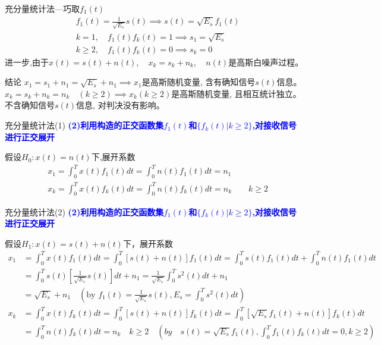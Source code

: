 \begin{frame}[shrink]{充分量统计法---巧取$f_1(t)$}
\begin{align*}
&f_1(t)=\frac{1}{\sqrt{E_s}}s(t)\implies s(t)=\sqrt{E_s}f_1(t)\\
&k=1,\quad f_1(t)f_k(t)=1\implies s_1=\sqrt{E_s}\\
&k\ge 2,\quad f_1(t)f_k(t)=0\implies s_k=0
\end{align*}
进一步,由于$x(t)=s(t)+n(t),\quad x_k=s_k+n_k,\quad n(t)$是高斯白噪声过程。
\begin{block}{结论}
	$x_1=s_1+n_1=\sqrt{E_s}+n_1\implies x_1$是高斯随机变量, 含有确知信号$s(t)$信息。\\
	$x_k=s_k+n_k=n_k\quad(k\ge 2)\implies x_k(k\ge 2)$是高斯随机变量,  且相互统计独立。不含确知信号$s(t)$信息, 对判决没有影响。\\
\end{block}
\end{frame}

\begin{frame}[shrink]{充分量统计法(1)}
\textbf{\textcolor{blue}{(2)利用构造的正交函数集$f_1(t)$和$\{f_k(t)|k\ge 2\}$,对接收信号进行正交展开}}
\begin{block}{假设$H_0:x(t)=n(t)$下,展开系数}
\begin{align*}	
&x_1=\int_{0}^{T}x(t)f_1(t)dt=\int_{0}^{T}n(t)f_1(t)dt=n_1\\
&x_k=\int_{0}^{T}x(t)f_k(t)dt=\int_{0}^{T}n(t)f_k(t)dt=n_k\qquad k\ge 2
\end{align*}
\end{block}
\end{frame}

\begin{frame}[shrink]{充分量统计法(2)}
\textbf{\textcolor{blue}{(2)利用构造的正交函数集$f_1(t)$和$\{f_k(t)|k\ge 2\}$,对接收信号进行正交展开}}
\begin{block}{假设$H_1:x(t)=s(t)+n(t)$下，展开系数}
\begin{align*}
	x_1&=\int_{0}^{T}x(t)f_1(t)dt=\int_{0}^{T}[s(t)+n(t)]f_1(t)dt=\int_{0}^{T}s(t)f_1(t)dt+\int_{0}^{T}n(t)f_1(t)dt\\
	&=\int_{0}^{T}s(t)[\frac{1}{\sqrt{E_s}}s(t)]dt+n_1=\frac{1}{\sqrt{E_s}}\int_{0}^{T}s^2(t)dt+n_1\\
	&=\sqrt{E_s}+n_1\quad (\text{by }f_1(t)=\frac{1}{\sqrt{E_s}}s(t),E_s=\int_{0}^{T}s^2(t)dt)\\
	x_k&=\int_{0}^{T}x(t)f_k(t)dt=\int_{0}^{T}[s(t)+n(t)]f_k(t)dt=\int_{0}^{T}[\sqrt{E_s}f_1(t)+n(t)]f_k(t)dt\\
	&=\int_{0}^{T}n(t)f_k(t)dt=n_k\quad k\ge 2\quad (by\quad s(t)=\sqrt{E_s}f_1(t), \int_{0}^{T}f_1(t)f_k(t)dt=0,k\ge 2)
\end{align*}
\end{block}
\end{frame}


